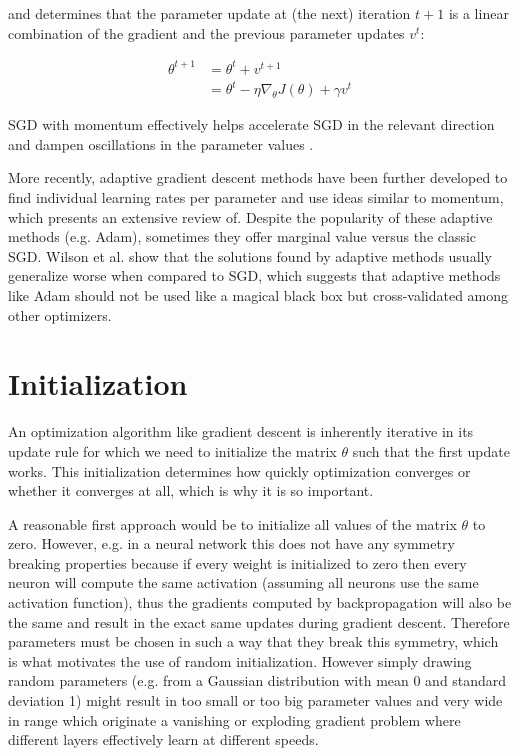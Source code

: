 and determines that the parameter update at (the next) iteration $t+1$ is a linear combination of the gradient and the previous parameter updates $v^{t}$:

\begin{align*}
    \theta^{t+1} &= \theta^{t} + v^{t+1} \\
                 &= \theta^{t} - \eta \nabla_{\theta} J(\theta) + \gamma v^{t}
\end{align*}

\ac{SGD} with momentum effectively helps accelerate \ac{SGD} in the relevant direction and dampen oscillations in the parameter values \cite{ruder2016}.

More recently, adaptive gradient descent methods have been further developed to find individual learning rates per parameter and use ideas similar to momentum, which \citeauthor{ruder2016} \cite{ruder2016} presents an extensive review of. Despite the popularity of these adaptive methods (e.g. Adam), sometimes they offer marginal value versus the classic \ac{SGD}. Wilson et al. \cite{wilson2017} show that the solutions found by adaptive methods usually generalize worse when compared to \ac{SGD}, which suggests that adaptive methods like Adam should not be used like a magical black box but cross-validated among other optimizers.

\section{Initialization}

An optimization algorithm like gradient descent is inherently iterative in its update rule for which we need to initialize the matrix $\theta$ such that the first update works. This initialization determines how quickly optimization converges or whether it converges at all, which is why it is so important.

A reasonable first approach would be to initialize all values of the matrix $\theta$ to zero. However, e.g. in a neural network this does not have any symmetry breaking properties because if every weight is initialized to zero then every neuron will compute the same activation (assuming all neurons use the same activation function), thus the gradients computed by backpropagation will also be the same and result in the exact same updates during gradient descent. Therefore parameters must be chosen in such a way that they break this symmetry, which is what motivates the use of random initialization. However simply drawing random parameters (e.g. from a Gaussian distribution with mean 0 and standard deviation 1) might result in too small or too big parameter values and very wide in range which originate a vanishing or exploding gradient problem where different layers effectively learn at different speeds.

